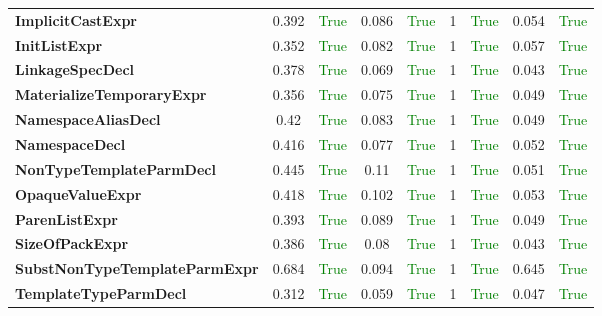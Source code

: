 \documentclass{article}
\begin{document}
\begin{xltabular}{\textwidth}{lcccccccc}
\textbf{{\fontsize{10}{12}\selectfont ImplicitCastExpr}}& 0.392&\textcolor{green}{True}& 0.086&\textcolor{green}{True}& 1&\textcolor{green}{True}& 0.054&\textcolor{green}{True} \\[0.5ex]
\textbf{{\fontsize{10}{12}\selectfont InitListExpr}}& 0.352&\textcolor{green}{True}& 0.082&\textcolor{green}{True}& 1&\textcolor{green}{True}& 0.057&\textcolor{green}{True} \\[0.5ex]
\textbf{{\fontsize{10}{12}\selectfont LinkageSpecDecl}}& 0.378&\textcolor{green}{True}& 0.069&\textcolor{green}{True}& 1&\textcolor{green}{True}& 0.043&\textcolor{green}{True} \\[0.5ex]
\textbf{{\fontsize{10}{12}\selectfont MaterializeTemporaryExpr}}& 0.356&\textcolor{green}{True}& 0.075&\textcolor{green}{True}& 1&\textcolor{green}{True}& 0.049&\textcolor{green}{True} \\[0.5ex]
\textbf{{\fontsize{10}{12}\selectfont NamespaceAliasDecl}}& 0.42&\textcolor{green}{True}& 0.083&\textcolor{green}{True}& 1&\textcolor{green}{True}& 0.049&\textcolor{green}{True} \\[0.5ex]
\textbf{{\fontsize{10}{12}\selectfont NamespaceDecl}}& 0.416&\textcolor{green}{True}& 0.077&\textcolor{green}{True}& 1&\textcolor{green}{True}& 0.052&\textcolor{green}{True} \\[0.5ex]
\textbf{{\fontsize{10}{12}\selectfont NonTypeTemplateParmDecl}}& 0.445&\textcolor{green}{True}& 0.11&\textcolor{green}{True}& 1&\textcolor{green}{True}& 0.051&\textcolor{green}{True} \\[0.5ex]
\textbf{{\fontsize{10}{12}\selectfont OpaqueValueExpr}}& 0.418&\textcolor{green}{True}& 0.102&\textcolor{green}{True}& 1&\textcolor{green}{True}& 0.053&\textcolor{green}{True} \\[0.5ex]
\textbf{{\fontsize{10}{12}\selectfont ParenListExpr}}& 0.393&\textcolor{green}{True}& 0.089&\textcolor{green}{True}& 1&\textcolor{green}{True}& 0.049&\textcolor{green}{True} \\[0.5ex]
\textbf{{\fontsize{10}{12}\selectfont SizeOfPackExpr}}& 0.386&\textcolor{green}{True}& 0.08&\textcolor{green}{True}& 1&\textcolor{green}{True}& 0.043&\textcolor{green}{True} \\[0.5ex]
\textbf{{\fontsize{10}{12}\selectfont SubstNonTypeTemplateParmExpr}}& 0.684&\textcolor{green}{True}& 0.094&\textcolor{green}{True}& 1&\textcolor{green}{True}& 0.645&\textcolor{green}{True} \\[0.5ex]
\textbf{{\fontsize{10}{12}\selectfont TemplateTypeParmDecl}}& 0.312&\textcolor{green}{True}& 0.059&\textcolor{green}{True}& 1&\textcolor{green}{True}& 0.047&\textcolor{green}{True} \\[0.5ex]

\end{xltabular}
\end{document}
